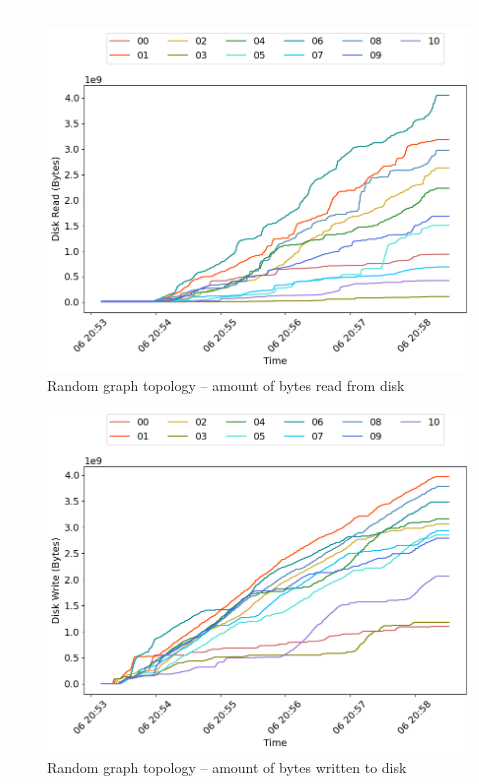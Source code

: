 \textcolor{white}{.}\\

\begin{minipage}{0.5\linewidth}
\begin{figure}[H]
\captionsetup{justification=centering,width=0.8\linewidth}
\includegraphics[width=\linewidth]{figures/graph-random/blk_read.png}
\caption{Random graph topology -- amount of bytes read from disk}
\label{fig:graph-random-net_read}
\end{figure}
\end{minipage}
\begin{minipage}{0.5\linewidth}
\begin{figure}[H]
\captionsetup{justification=centering,width=0.8\linewidth}
\includegraphics[width=\linewidth]{figures/graph-random/blk_write.png}
\caption{Random graph topology -- amount of bytes written to disk}
\label{fig:graph-random-net_write}
\end{figure}
\end{minipage}

